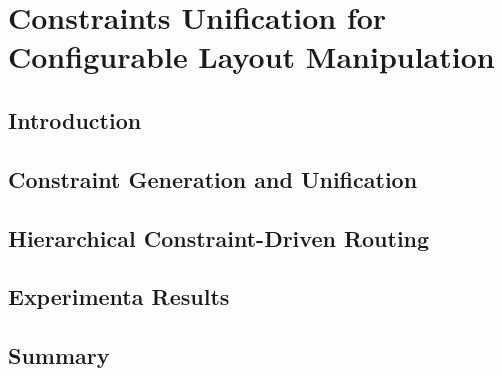 
\chapter{Constraints Unification for Configurable Layout Manipulation}\label{chap:CUCLM}
  \section{Introduction}\label{sec:CUCLMIntro}
  \section{Constraint Generation and Unification}\label{sec:ConGenUni}
  \section{Hierarchical Constraint-Driven Routing}\label{sec:HCDR}
  \section{Experimenta Results}\label{sec:CUCLMExp}
  \section{Summary}\label{sec:CUCLMSum}